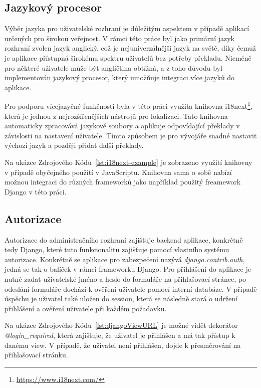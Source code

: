 \subsection{Jazykový procesor}
\label{subsec:implementation-technologies-compiler}
Výběr jazyka pro uživatelské rozhraní je důležitým aspektem v případě aplikací určených pro širokou veřejnost. V rámci této práce byl jako primární jazyk rozhraní zvolen jazyk anglický, což je nejuniverzálnější jazyk na světě, díky čemuž je aplikace přístupná širokému spektru uživatelů bez potřeby překladu. Nicméně pro některé uživatele může být angličtina obtížná, a z toho důvodu byl implementován jazykový procesor, který umožňuje integraci více jazyků do aplikace.

Pro podporu vícejazyčné funkčnosti byla v této práci využita knihovna i18next\footnote{\href{https://www.i18next.com/}{https://www.i18next.com/}}, která je jednou z nejrozšířenějších nástrojů pro lokalizaci. Tato knihovna automaticky zpracovává jazykové soubory a aplikuje odpovídající překlady v závislosti na nastavení uživatele. Tímto způsobem je pro vývojáře snadné nastavit výchozí jazyk a později přidat další překlady.



Na ukázce Zdrojového Kódu~\ref{lst:i18next-example} je zobrazeno využití knihovny v případě obyčejného použití v JavaScriptu. Knihovna sama o sobě nabízí možnou integraci do různých frameworků jako například použitý freamework Django v této práci.

\subsection{Autorizace}
\label{subsec:implementation-technologies-authorization}
Autorizace do administračního rozhraní zajišťuje backend aplikace, konkrétně tedy Django, které tuto funkcionalitu zajišťuje pomocí vlastního systému autorizace. Konkrétně se aplikace pro zabezpečení nazývá \textit{django.contrib.auth}, jedná se tak o balíček v rámci frameworku Django. Pro přihlášení do aplikace je nutné zadat uživatelské jméno a heslo do formuláře na přihlašovací stránce, po odeslání formuláře dochází k ověření uživatele pomocí interní databáze. V případě úspěchu je uživatel také uložen do session, která se následně stará o udržení přihlášení a ověření uživatele při každém požadavku.

Na ukázce Zdrojového Kódu~\ref{lst:djangoViewURL} je možné vidět dekorátor \textit{@login\_required}, která zajišťuje, že uživatel je přihlášen a má tak přístup k danému view. V případě, že uživatel není přihlášen, dojde k přesměrování na přihlašovací stránku.

